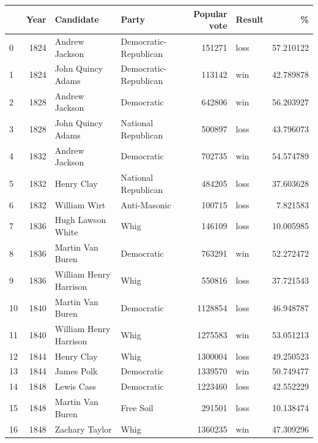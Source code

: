 \documentclass[
  letterpaper,
  DIV=11,
  numbers=noendperiod]{scrreprt}
\begin{document}
\begin{tabular}{lrllrlr}
\toprule
{} &  Year &               Candidate &                  Party &  Popular vote & Result &          \% \\
\midrule
0   &  1824 &          Andrew Jackson &  Democratic-Republican &        151271 &   loss &  57.210122 \\
1   &  1824 &       John Quincy Adams &  Democratic-Republican &        113142 &    win &  42.789878 \\
2   &  1828 &          Andrew Jackson &             Democratic &        642806 &    win &  56.203927 \\
3   &  1828 &       John Quincy Adams &    National Republican &        500897 &   loss &  43.796073 \\
4   &  1832 &          Andrew Jackson &             Democratic &        702735 &    win &  54.574789 \\
5   &  1832 &              Henry Clay &    National Republican &        484205 &   loss &  37.603628 \\
6   &  1832 &            William Wirt &           Anti-Masonic &        100715 &   loss &   7.821583 \\
7   &  1836 &       Hugh Lawson White &                   Whig &        146109 &   loss &  10.005985 \\
8   &  1836 &        Martin Van Buren &             Democratic &        763291 &    win &  52.272472 \\
9   &  1836 &  William Henry Harrison &                   Whig &        550816 &   loss &  37.721543 \\
10  &  1840 &        Martin Van Buren &             Democratic &       1128854 &   loss &  46.948787 \\
11  &  1840 &  William Henry Harrison &                   Whig &       1275583 &    win &  53.051213 \\
12  &  1844 &              Henry Clay &                   Whig &       1300004 &   loss &  49.250523 \\
13  &  1844 &              James Polk &             Democratic &       1339570 &    win &  50.749477 \\
14  &  1848 &              Lewis Cass &             Democratic &       1223460 &   loss &  42.552229 \\
15  &  1848 &        Martin Van Buren &              Free Soil &        291501 &   loss &  10.138474 \\
16  &  1848 &          Zachary Taylor &                   Whig &       1360235 &    win &  47.309296 \\

\end{tabular}
\end{document}
